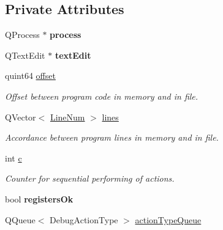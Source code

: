 \subsection*{Private Attributes}
\begin{DoxyCompactItemize}
\item 
\hypertarget{class_debugger_a3d2a0063b413ae6b22a1c970d6fa255c}{}Q\+Process $\ast$ {\bfseries process}\label{class_debugger_a3d2a0063b413ae6b22a1c970d6fa255c}

\item 
\hypertarget{class_debugger_a99e176dedc29ecb4a7995df3c853c43c}{}Q\+Text\+Edit $\ast$ {\bfseries text\+Edit}\label{class_debugger_a99e176dedc29ecb4a7995df3c853c43c}

\item 
\hypertarget{class_debugger_a9520cdbe94f115c987328c526116323b}{}quint64 \hyperlink{class_debugger_a9520cdbe94f115c987328c526116323b}{offset}\label{class_debugger_a9520cdbe94f115c987328c526116323b}

\begin{DoxyCompactList}\small\item\em Offset between program code in memory and in file. \end{DoxyCompactList}\item 
\hypertarget{class_debugger_acf8d80ba5fb7408aef12c82b687ae416}{}Q\+Vector$<$ \hyperlink{struct_assembler_1_1_line_num}{Line\+Num} $>$ \hyperlink{class_debugger_acf8d80ba5fb7408aef12c82b687ae416}{lines}\label{class_debugger_acf8d80ba5fb7408aef12c82b687ae416}

\begin{DoxyCompactList}\small\item\em Accordance between program lines in memory and in file. \end{DoxyCompactList}\item 
\hypertarget{class_debugger_a685a71e032e775b881e76fb62b9bf702}{}int \hyperlink{class_debugger_a685a71e032e775b881e76fb62b9bf702}{c}\label{class_debugger_a685a71e032e775b881e76fb62b9bf702}

\begin{DoxyCompactList}\small\item\em Counter for sequential performing of actions. \end{DoxyCompactList}\item 
\hypertarget{class_debugger_a2868873b7e2c82002aca656a4c88d1d1}{}bool {\bfseries registers\+Ok}\label{class_debugger_a2868873b7e2c82002aca656a4c88d1d1}

\item 
\hypertarget{class_debugger_a3d7e051e61a7d69df940301617860640}{}Q\+Queue$<$ Debug\+Action\+Type $>$ \hyperlink{class_debugger_a3d7e051e61a7d69df940301617860640}{action\+Type\+Queue}\label{class_debugger_a3d7e051e61a7d69df940301617860640}


\end{DoxyCompactItemize}
